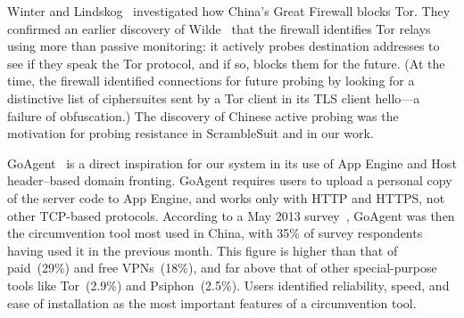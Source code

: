\documentclass{article}
\begin{document}

Winter and Lindskog~\cite{foci12-winter} investigated how China's Great Firewall blocks Tor.
They confirmed an earlier discovery of Wilde~\cite{wilde} that the firewall identifies Tor relays using more than passive monitoring:
it actively probes destination addresses to see if they speak the Tor protocol, and if so,
blocks them for the future.
(At the time, the firewall identified connections for future probing by looking for a distinctive
list of ciphersuites sent by a Tor client in its TLS client hello---a failure of obfuscation.) %
The discovery of Chinese active probing was the motivation for probing resistance in ScrambleSuit
and in our work.

GoAgent~\cite{goagent} is a direct inspiration for our system in its use of App
Engine and Host header--based domain fronting. GoAgent requires users to upload
a personal copy of the server code to App Engine, and works only with HTTP and HTTPS,
not other TCP-based protocols.
According to a May 2013 survey~\cite{collateral-freedom},
GoAgent was then the circumvention tool most used in
China, with 35\% of survey respondents having used it in the previous month.
This figure is higher than that of paid~(29\%) and free VPNs~(18\%), and far
above that of other special-purpose tools like Tor~(2.9\%) and Psiphon~(2.5\%).
Users identified reliability, speed, and ease of installation as the most important features of a circumvention tool.


  

\end{document}
